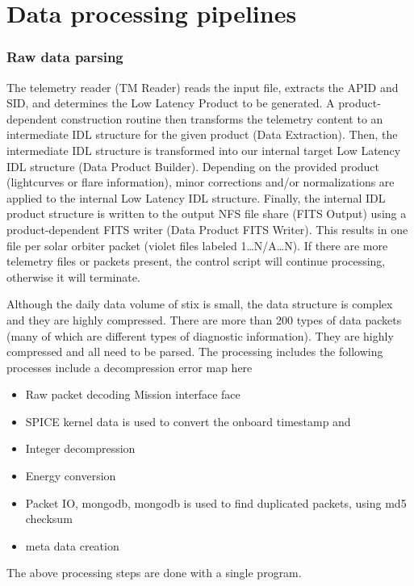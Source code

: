 \documentclass{aa}
\begin{document}
\section{Data processing pipelines}

\subsubsection{Raw data parsing}
The telemetry reader (TM Reader) reads the input file, extracts the APID and SID, and determines the Low Latency Product to be generated. A product-dependent construction routine then transforms the telemetry content to an intermediate IDL structure for the given product (Data Extraction). Then, the intermediate IDL structure is transformed into our internal target Low Latency IDL structure (Data Product Builder). Depending on the provided product (lightcurves or flare information), minor corrections and/or normalizations are applied to the internal Low Latency IDL structure. Finally, the internal IDL product structure is written to the output NFS file share (FITS Output) using a product-dependent FITS writer (Data Product FITS Writer). This results in one file per solar orbiter packet (violet files labeled 1…N/A…N). If there are more telemetry files or packets present, the control script will continue processing, otherwise it will terminate.


Although the daily data volume of stix is small, the data structure is complex and they are highly compressed.
There are more than 200 types of data packets (many of which are different types
of diagnostic information).
They are highly compressed and all need to be parsed.
The processing includes the following processes
include a decompression error map here
\begin{itemize}
 \item Raw packet decoding Mission interface face
\item SPICE kernel data is used to convert the onboard timestamp and
\item Integer decompression
\item Energy conversion
\item Packet IO, mongodb,  mongodb is used to find duplicated packets, using md5 checksum
\item meta data creation
\end{itemize}

The above processing steps are done with a single program.
\end{document}
